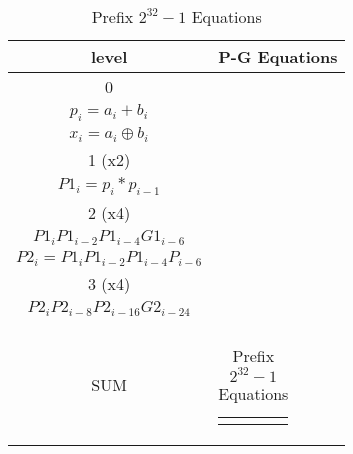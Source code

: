\begin{table}[H]
\centering
     \begin{tabularx}{\textwidth}{ || c | X || } 

        \hline
        level & P-G Equations\\
        \hline
        \hline
 
        0   & 
        \begin{tabular}{@{}c@{}}
        $g_i = a_i * b_i$\\
        $p_i = a_i + b_i$\\
        $x_i = a_i \oplus b_i $
        \end{tabular}\\\hline

        1 (x2)  & 
        \begin{tabular}{@{}c@{}}
        $G1_i = g_i + p_ig_{i-1}$\\
        $P1_i = p_i * p_{i-1}$
        \end{tabular}\\\hline

        2 (x4)  & 
        \begin{tabular}{@{}c@{}}
        $G2_i = G1_i + P1_{i}G1_{i-2} + P1_{i}P1_{i-2}G1_{i-4} +$ \\ $P1_{i}P1_{i-2}P1_{i-4}G1_{i-6}$\\
        $P2_i = P1_{i}P1_{i-2}P1_{i-4}P_{i-6}$
        \end{tabular}\\\hline
        
        3 (x4)  & 
        \begin{tabular}{@{}c@{}}
        $G3_i = G2_i + P2_{i}G2_{i-8} + P2_{i}P2_{i-8}G2_{i-16} +$ \\ $P2_{i}P2_{i-8}P2_{i-16}G2_{i-24}$\\
        \end{tabular}\\\hline
        
        SUM   & 
        \begin{tabular}{@{}c@{}}
        $ sum_i = G_{i-1} \oplus x_i$
        \end{tabular}\\\hline

    \end{tabularx}
\caption{Prefix $2^{32}-1$ Equations}
\end{table}


